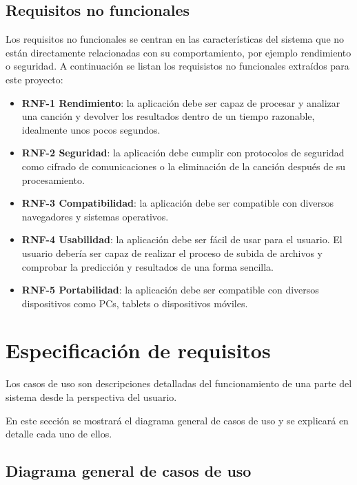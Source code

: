 \subsection{Requisitos no funcionales}

Los requisitos no funcionales se centran en las características del sistema que no están directamente relacionadas con su comportamiento, por ejemplo rendimiento o seguridad.
A continuación se listan los requisistos no funcionales extraídos para este proyecto:

\begin{itemize}
\tightlist
\item \textbf{RNF-1 Rendimiento}: la aplicación debe ser capaz de procesar y analizar una canción y devolver los resultados dentro de un tiempo razonable, idealmente unos pocos segundos.

\item \textbf{RNF-2 Seguridad}: la aplicación debe cumplir con protocolos de seguridad como cifrado de comunicaciones o la eliminación de la canción después de su procesamiento.

\item \textbf{RNF-3 Compatibilidad}: la aplicación debe ser compatible con diversos navegadores y sistemas operativos.

\item \textbf{RNF-4 Usabilidad}: la aplicación debe ser fácil de usar para el usuario. El usuario debería ser capaz de realizar el proceso de subida de archivos y comprobar la predicción y resultados de una forma sencilla.

\item \textbf{RNF-5 Portabilidad}: la aplicación debe ser compatible con diversos dispositivos como PCs, tablets o dispositivos móviles.
\end{itemize}

\section{Especificación de requisitos}

Los casos de uso son descripciones detalladas del funcionamiento de una parte del sistema desde la perspectiva del usuario.

En este sección se mostrará el diagrama general de casos de uso y se explicará en detalle cada uno de ellos.

\subsection{Diagrama general de casos de uso}

